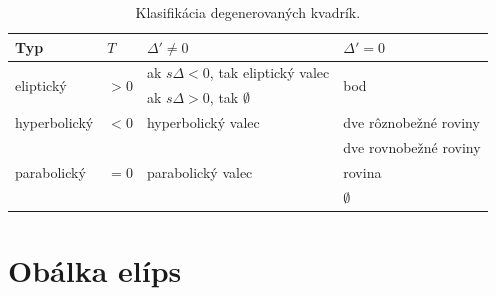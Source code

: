 
\begin{table}[h]
\centering
\begin{tabular}{|l|l|l|l|}
\hline
Typ & $T$ & $\Delta' \neq  0$ & $\Delta' = 0 $ \\
\hline
\multirow{2}{*}{eliptický} & \multirow{2}{*}{$> 0$} & ak $s\Delta < 0$, tak eliptický valec & \multirow{2}{*}{bod} \\
& & ak $s\Delta > 0$, tak $\emptyset$ &\\
\hline
hyperbolický & $< 0$ & hyperbolický valec & dve rôznobežné roviny \\
\hline
\multirow{3}{*}{parabolický} & \multirow{3}{*}{$= 0$} & \multirow{3}{*}{parabolický valec} & dve rovnobežné roviny \\
& & & rovina \\
& & & $\emptyset$ \\
\hline
\end{tabular}
\caption{Klasifikácia degenerovaných kvadrík.}
\label{tab:degenerate_quadrics}
\end{table}

\section{Obálka elíps}
